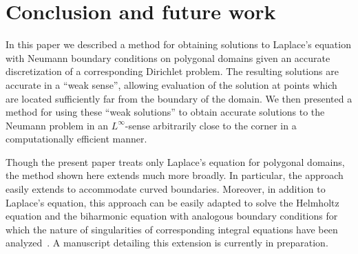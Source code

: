 
\section{Conclusion and future work}

In this paper we described a method for obtaining solutions to Laplace's equation with Neumann boundary conditions 
on polygonal domains given an accurate discretization of a corresponding Dirichlet problem. 
The resulting solutions are accurate in a 
``weak sense'', allowing evaluation of the solution at points which are located sufficiently far from the boundary of the 
domain. We then presented a method for using these ``weak solutions'' to obtain accurate solutions to the Neumann problem 
in an $L^\infty$-sense arbitrarily close to the corner in a computationally efficient manner. 

Though the present paper treats only Laplace's equation for polygonal domains, the method shown here extends 
much more broadly. In particular, the approach easily extends to accommodate curved boundaries. Moreover, in addition 
to Laplace's equation, this approach can be easily adapted to solve the Helmholtz equation and the biharmonic equation with analogous boundary conditions for which the nature of singularities of corresponding integral equations have been analyzed~\cite{serkhrachh,serkhpnas}. A manuscript detailing this extension is currently in preparation.